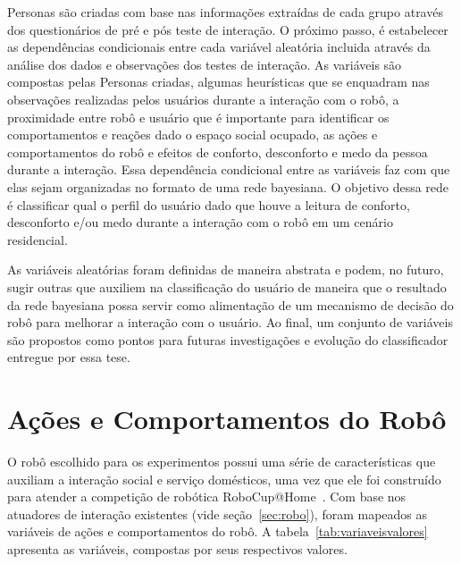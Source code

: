 Personas são criadas com base nas informações extraídas de cada grupo através dos questionários de pré e pós teste de interação. O próximo passo, é estabelecer as dependências condicionais entre cada variável aleatória incluida através da análise dos dados e observações dos testes de interação. As variáveis são compostas pelas Personas criadas, algumas heurísticas que se enquadram nas observações realizadas pelos usuários durante a interação com o robô, a proximidade entre robô e usuário que é importante para identificar os comportamentos e reações dado o espaço social ocupado, as ações e comportamentos do robô e efeitos de conforto, desconforto e medo da pessoa durante a interação. Essa dependência condicional entre as variáveis faz com que elas sejam organizadas no formato de uma rede bayesiana. O objetivo dessa rede é classificar qual o perfil do usuário dado que houve a leitura de conforto, desconforto e/ou medo durante a interação com o robô em um cenário residencial.

As variáveis aleatórias foram definidas de maneira abstrata e podem, no futuro, sugir outras que auxiliem na classificação do usuário de maneira que o resultado da rede bayesiana possa servir como alimentação de um mecanismo de decisão do robô para melhorar a interação com o usuário. Ao final, um conjunto de variáveis são propostos como pontos para futuras investigações e evolução do classificador entregue por essa tese.

\section{Ações e Comportamentos do Robô}
\label{sec:comportamento-robo}
O robô escolhido para os experimentos possui uma série de características que auxiliam a interação social e serviço domésticos, uma vez que ele foi construído para atender a competição de robótica RoboCup@Home~\cite{robocup:2015}. Com base nos atuadores de interação existentes (vide seção~\ref{sec:robo}), foram mapeados as variáveis de ações e comportamentos do robô. A tabela~\ref{tab:variaveisvalores} apresenta as variáveis, compostas por seus respectivos valores.

